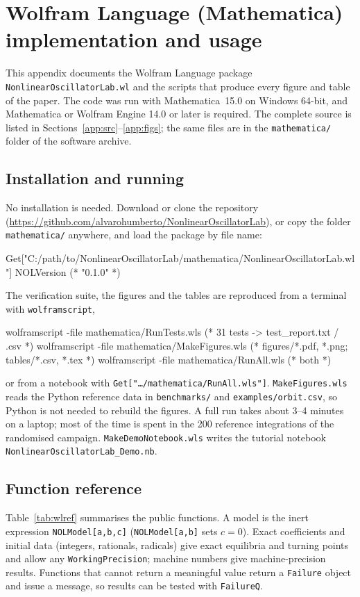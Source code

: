 \documentclass[11pt]{article}
\begin{document}
\clearpage
\appendix
\nolinenumbers
\section{Wolfram Language (Mathematica) implementation and usage}\label{app:wl}
This appendix documents the Wolfram Language package \texttt{NonlinearOscillatorLab.wl} and the scripts that produce every figure and table of the paper. The code was run with Mathematica~15.0 on Windows 64-bit, and Mathematica or Wolfram Engine 14.0 or later is required. The complete source is listed in Sections~\ref{app:src}--\ref{app:figs}; the same files are in the \texttt{mathematica/} folder of the software archive.

\subsection{Installation and running}
No installation is needed. Download or clone the repository (\url{https://github.com/alvarohumberto/NonlinearOscillatorLab}), or copy the folder \texttt{mathematica/} anywhere, and load the package by file name:
\begin{wlcode}
Get["C:/path/to/NonlinearOscillatorLab/mathematica/NonlinearOscillatorLab.wl"]
NOLVersion        (* "0.1.0" *)
\end{wlcode}
The verification suite, the figures and the tables are reproduced from a terminal with \texttt{wolframscript},
\begin{wlcode}
wolframscript -file mathematica/RunTests.wls      (* 31 tests -> test_report.txt / .csv *)
wolframscript -file mathematica/MakeFigures.wls   (* figures/*.pdf, *.png; tables/*.csv, *.tex *)
wolframscript -file mathematica/RunAll.wls        (* both *)
\end{wlcode}
or from a notebook with \texttt{Get["\dots/mathematica/RunAll.wls"]}. \texttt{MakeFigures.wls} reads the Python reference data in \texttt{benchmarks/} and \texttt{examples/orbit.csv}, so Python is not needed to rebuild the figures. A full run takes about 3--4 minutes on a laptop; most of the time is spent in the 200 reference integrations of the randomised campaign. \texttt{MakeDemoNotebook.wls} writes the tutorial notebook \texttt{NonlinearOscillatorLab\_Demo.nb}.

\subsection{Function reference}
Table~\ref{tab:wlref} summarises the public functions. A model is the inert expression \texttt{NOLModel[a,b,c]} (\texttt{NOLModel[a,b]} sets $c=0$). Exact coefficients and initial data (integers, rationals, radicals) give exact equilibria and turning points and allow any \texttt{WorkingPrecision}; machine numbers give machine-precision results. Functions that cannot return a meaningful value return a \texttt{Failure} object and issue a message, so results can be tested with \texttt{FailureQ}.
\end{document}
